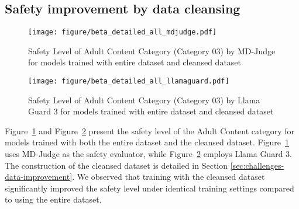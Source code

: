 \newpage
\subsection{Safety improvement by data cleansing}
\label{appendix:safety-green-full}
\begin{figure}[h]
    \centering
    \texttt{[image: figure/beta\_detailed\_all\_mdjudge.pdf]}
    \caption{Safety Level of Adult Content Category (Category 03) by MD-Judge for models trained with entire dataset and cleansed dataset}
    \label{fig:safety-green-full-mdjudge}
\end{figure}

\begin{figure}[h]
    \centering
    \texttt{[image: figure/beta\_detailed\_all\_llamaguard.pdf]}
    \caption{Safety Level of Adult Content Category (Category 03) by Llama Guard 3 for models trained with entire dataset and cleansed dataset}
    \label{fig:safety-green-full-llamaguard}
\end{figure}

Figure~\ref{fig:safety-green-full-mdjudge} and Figure~\ref{fig:safety-green-full-llamaguard} present the safety level of the Adult Content category for models trained with both the entire dataset and the cleansed dataset. Figure~\ref{fig:safety-green-full-mdjudge} uses MD-Judge as the safety evaluator, while Figure~\ref{fig:safety-green-full-llamaguard} employs Llama Guard 3. The construction of the cleansed dataset is detailed in Section \ref{sec:challenges-data-improvement}. We observed that training with the cleansed dataset significantly improved the safety level under identical training settings compared to using the entire dataset.

\clearpage